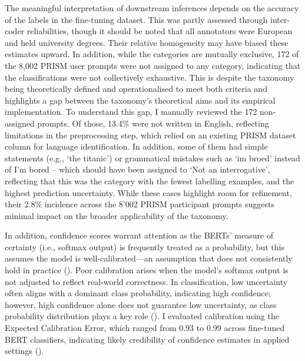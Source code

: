 \documentclass[
  12pt,
]{article}
\begin{document}
The meaningful interpretation of downstream inferences depends on the accuracy of the labels in the fine-tuning dataset. This was partly assessed through inter-coder reliabilities, though it should be noted that all annotators were European and held university degrees. Their relative homogeneity may have biased these estimates upward. In addition, while the categories are mutually exclusive, 172 of the 8,002 PRISM user prompts were not assigned to any category, indicating that the classifications were not collectively exhaustive. This is despite the taxonomy being theoretically defined and operationalised to meet both criteria and highlights a gap between the taxonomy's theoretical aims and its empirical implementation. To understand this gap, I manually reviewed the 172 non-assigned prompts. Of those, 13.4\% were not written in English, reflecting limitations in the preprocessing step, which relied on an existing PRISM dataset column for language identification. In addition, some of them had simple statements (e.g., `the titanic') or grammatical mistakes such as `im broed' instead of I'm bored -- which should have been assigned to `Not an interrogative', reflecting that this was the category with the fewest labelling examples, and the highest prediction uncertainty. While these cases highlight room for refinement, their 2.8\% incidence across the 8'002 PRISM participant prompts suggests minimal impact on the broader applicability of the taxonomy.

In addition, confidence scores warrant attention as the BERTs' measure of certainty (i.e., softmax output) is frequently treated as a probability, but this assumes the model is well-calibrated---an assumption that does not consistently hold in practice (). Poor calibration arises when the model's softmax output is not adjusted to reflect real-world correctness. In classification, low uncertainty often aligns with a dominant class probability, indicating high confidence; however, high confidence alone does not guarantee low uncertainty, as class probability distribution plays a key role (). I evaluated calibration using the Expected Calibration Error, which ranged from 0.93 to 0.99 across fine-tuned BERT classifiers, indicating likely credibility of confidence estimates in applied settings ().
\end{document}
